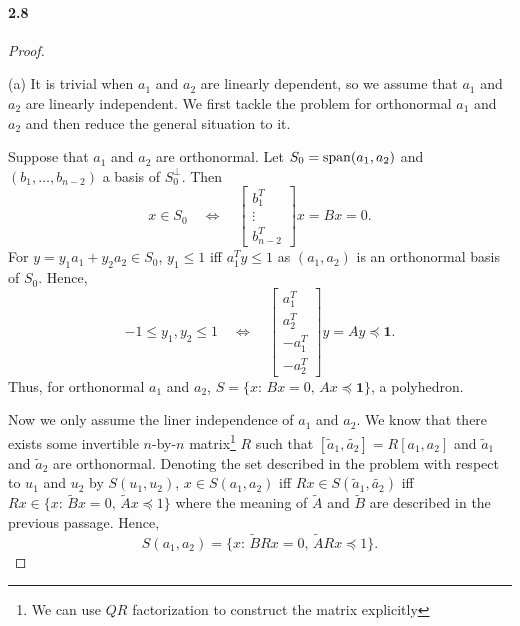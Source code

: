   \paragraph{2.8}
  \begin{proof}
    $\,$\par
    (a) It is trivial when $a_1$ and $a_2$ are linearly dependent, so we assume 
    that $a_1$ and $a_2$ are linearly independent. We first tackle the problem
    for orthonormal $a_1$ and $a_2$ and then reduce the general situation to it.
    \par
    Suppose that $a_1$ and $a_2$ are orthonormal. Let $S_0=\operatorname{span}(a_1,a_2)$ and 
    $(b_1,\dots,b_{n-2})$ a basis of $S_0^\perp$. Then
    \[
      x\in S_0 \quad\Leftrightarrow\quad
      \begin{bmatrix}
        b_1^T \\ \vdots \\ b_{n-2}^T 
      \end{bmatrix}x = Bx = 0.
    \]
    For $y=y_1a_1+y_2a_2\in S_0$, $y_1\le 1$ iff $a_1^Ty \le 1$ as $(a_1,a_2)$
    is an orthonormal basis of $S_0$. Hence, 
    \[
      -1\le y_1,y_2\le 1 \quad\Leftrightarrow\quad
      \begin{bmatrix}
        a_1^T \\ a_2^T \\ -a_1^T \\ -a_2^T
      \end{bmatrix}y = Ay \preceq \mathbf{1}.
    \]
    Thus, for orthonormal $a_1$ and $a_2$, $S=\{x:\,Bx=0,\,Ax\preceq\mathbf{1}\}
    $, a polyhedron.\par
    Now we only assume the liner independence of $a_1$ and $a_2$. We know that
    there exists some invertible $n$-by-$n$ matrix\footnote{We can use $QR$ 
    factorization to construct the matrix explicitly} $R$ such that $[
    \tilde{a}_1,\tilde{a_2}]=R[a_1,a_2]$ and $\tilde{a}_1$ and $\tilde{a}_2$ are
    orthonormal. Denoting the set described in the problem with respect to $u_1$
    and $u_2$ by $S(u_1,u_2)$, $x\in S(a_1,a_2)$ iff $Rx\in S(\tilde{a}_1,
    \tilde{a_2})$ iff $Rx \in \{x:\,\tilde{B}x=0,\, \tilde{A}x\preceq 1\}$ where
    the meaning of $\tilde{A}$ and $\tilde{B}$ are described in the previous
    passage. Hence, 
    \[
      S(a_1,a_2) = \{x:\, \tilde{B}Rx=0,\, \tilde{A}Rx\preceq 1\}.
    \]
    

\end{proof}
